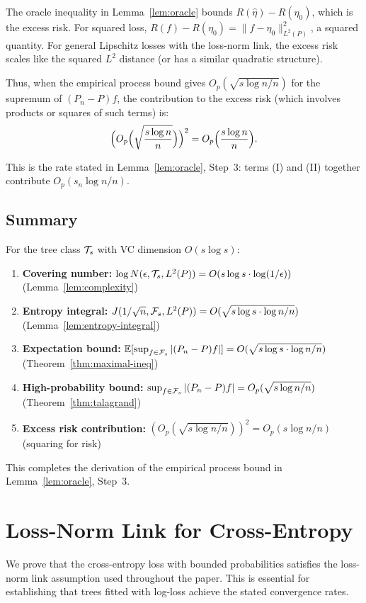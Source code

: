 \documentclass[12pt]{article}
\begin{document}
The oracle inequality in Lemma~\ref{lem:oracle} bounds $R(\hat\eta) - R(\eta_0)$, which is the excess risk. For squared loss, $R(f) - R(\eta_0) = \|f - \eta_0\|_{L^2(P)}^2$, a squared quantity. For general Lipschitz losses with the loss-norm link, the excess risk scales like the squared $L^2$ distance (or has a similar quadratic structure).

Thus, when the empirical process bound gives $O_p(\sqrt{s \log n / n})$ for the supremum of $(P_n - P)f$, the contribution to the excess risk (which involves products or squares of such terms) is:
\[
\Bigl( O_p\Bigl(\sqrt{\frac{s \log n}{n}}\Bigr) \Bigr)^2 = O_p\Bigl( \frac{s \log n}{n} \Bigr).
\]

This is the rate stated in Lemma~\ref{lem:oracle}, Step~3: terms (I) and (II) together contribute $O_p(s_n \log n / n)$.

\subsection{Summary}

For the tree class $\mathcal{T}_s$ with VC dimension $O(s \log s)$:
\begin{enumerate}
\item \textbf{Covering number:} $\log N(\epsilon, \mathcal{T}_s, L^2(P)) = O(s \log s \cdot \log(1/\epsilon))$ (Lemma~\ref{lem:complexity})
\item \textbf{Entropy integral:} $J(1/\sqrt{n}, \mathcal{F}_s, L^2(P)) = O(\sqrt{s \log s \cdot \log n / n})$ (Lemma~\ref{lem:entropy-integral})
\item \textbf{Expectation bound:} $\mathbb{E}[\sup_{f \in \mathcal{F}_s} |(P_n - P)f|] = O(\sqrt{s \log s \cdot \log n / n})$ (Theorem~\ref{thm:maximal-ineq})
\item \textbf{High-probability bound:} $\sup_{f \in \mathcal{F}_s} |(P_n - P)f| = O_p(\sqrt{s \log n / n})$ (Theorem~\ref{thm:talagrand})
\item \textbf{Excess risk contribution:} $(O_p(\sqrt{s \log n / n}))^2 = O_p(s \log n / n)$ (squaring for risk)
\end{enumerate}

This completes the derivation of the empirical process bound in Lemma~\ref{lem:oracle}, Step~3.

\section{Loss-Norm Link for Cross-Entropy}
\label{app:loss-norm}

We prove that the cross-entropy loss with bounded probabilities satisfies the loss-norm link assumption used throughout the paper. This is essential for establishing that trees fitted with log-loss achieve the stated convergence rates.
\end{document}
